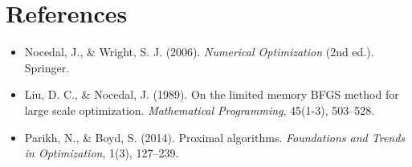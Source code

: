 \documentclass[11pt, a4paper, oneside]{article}
\begin{document}
\section{References}

\begin{itemize}
    \item Nocedal, J., \& Wright, S. J. (2006). \textit{Numerical Optimization} (2nd ed.). Springer.
    \item Liu, D. C., \& Nocedal, J. (1989). On the limited memory BFGS method for large scale optimization. \textit{Mathematical Programming}, 45(1-3), 503--528.
    \item Parikh, N., \& Boyd, S. (2014). Proximal algorithms. \textit{Foundations and Trends in Optimization}, 1(3), 127--239.
\end{itemize}
\end{document}
